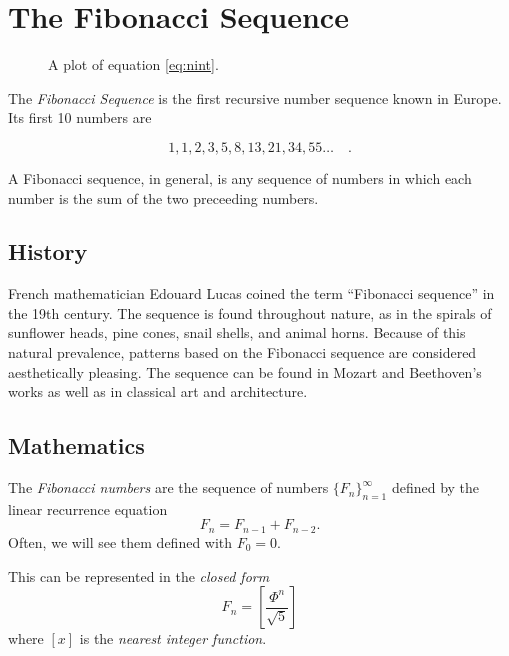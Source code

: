 \section{The Fibonacci Sequence}

\begin{figure}[h]
  \begin{center}
    
  \end{center}
  \caption{A plot of equation \ref{eq:nint}.}
\end{figure}
The \emph{Fibonacci Sequence} is the first recursive number sequence known in Europe. Its first 10 numbers are

\[ 1, 1, 2, 3, 5, 8, 13, 21, 34, 55\dots \quad \text{.} \]

A Fibonacci sequence, in general, is any sequence of numbers in which each number is the sum of the two preceeding numbers.\cite{britannica12}


\subsection{History}

French mathematician Edouard Lucas coined the term ``Fibonacci sequence'' in the 19th century.
The sequence is found throughout nature, as in the spirals of sunflower heads, pine cones, snail shells, and animal horns.\cite{britannica12}
Because of this natural prevalence, patterns based on the Fibonacci sequence are considered aesthetically pleasing.
The sequence can be found in Mozart and Beethoven's works as well as in classical art and architecture. \cite[p.~94]{design10}


\subsection{Mathematics}

\begin{defn}The \emph{Fibonacci numbers} are the sequence of numbers \(\{F_n\}^\infty_{n=1}\) defined by the linear recurrence equation
\begin{equation}
  F_n=F_{n-1}+F_{n-2} \text{.}
\end{equation}
Often, we will see them defined with \(F_0=0\).
\end{defn}

This can be represented in the \emph{closed form}
\begin{equation}
  F_n=\left[ \frac{\Phi^n}{\sqrt{5}}\right]
  \label{eq:nint}
\end{equation}
where \([x]\) is the \emph{nearest integer function}. \cite{mwfib}


